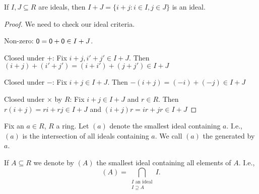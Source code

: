 \documentclass[notes.tex]{subfiles}
\begin{document}
\begin{proposition}
	If $I, J\subseteq R$ are ideals, then $I+J = \{i+j: i\in I, j\in J \}$ is an ideal.
\end{proposition}
\begin{proof}
	We need to check our ideal criteria.

	Non-zero: $\mathsf{0} = \mathsf{0} + \mathsf{0} \in I+J$.

	Closed under $+$: Fix $i+j, i'+j' \in I+J$. Then $(i+j) + (i'+j') = (i+i') + (j+j') \in I+J$

	Closed under $-$: Fix $i+j\in I+J$. Then $-(i+j) = (-i)+(-j) \in I+J$

	Closed under $\times$ by $R$:
	Fix $i+j\in I+J$ and $r\in R$.
	Then $r(i+j) = ri + rj \in I+J$ and $(i+j)r = ir + jr \in I+J$
\end{proof}

\begin{defn}
	Fix an $a\in R$, $R$ a ring. Let $(a)$ denote the smallest ideal containing $a$.
	I.e., $(a)$ is the intersection of all ideals containing $a$.
	We call $(a)$ the  generated by $a$.

  If $A\subseteq R$ we denote by $(A)$ the smallest ideal containing all elements of $A$. I.e., \[(A) = \bigcap_{\substack{I\text{ an ideal}\\I \supseteq A}}I.\]
\end{defn}
\end{document}
